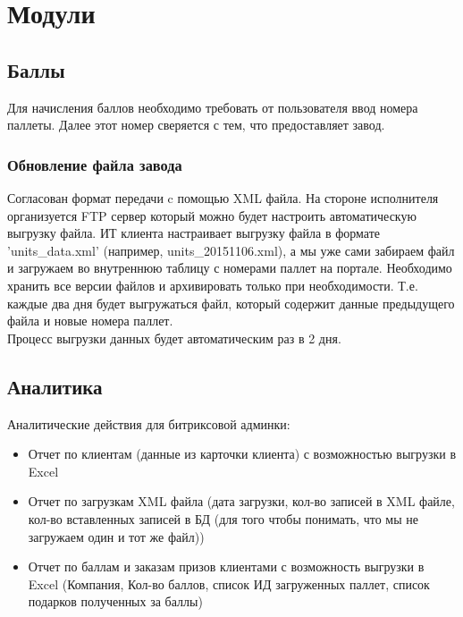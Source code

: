 \documentclass[DIV=calc, paper=a4, fontsize=11pt]{scrartcl} %
\begin{document}
\section{Модули} \label{sec:modules}

\subsection{Баллы}

Для начисления баллов необходимо требовать от пользователя ввод номера паллеты. Далее этот номер сверяется с тем, что предоставляет завод.

\subsubsection{Обновление файла завода}

Согласован формат передачи c помощью XML файла. На стороне исполнителя организуется FTP сервер который можно будет настроить автоматическую выгрузку файла. ИТ клиента настраивает выгрузку файла в формате 'units\_data.xml' (например, units\_20151106.xml), а мы уже сами забираем файл и загружаем во внутреннюю таблицу с номерами паллет на портале. Необходимо хранить все версии файлов и архивировать только при необходимости. Т.е. каждые два дня будет выгружаться файл, который содержит данные предыдущего файла и новые номера паллет.
\\[0.5cm]
Процесс выгрузки данных будет автоматическим раз в 2 дня.

\subsection{Аналитика}

Аналитические действия для битриксовой админки:

\begin{itemize}
	\item Отчет по клиентам (данные из карточки клиента) с возможностью выгрузки в Excel
	\item Отчет по загрузкам XML файла (дата загрузки, кол-во записей в XML файле, кол-во вставленных записей в БД (для того чтобы понимать, что мы не загружаем один и тот же файл))
	\item Отчет по баллам и заказам призов клиентами с возможность выгрузки в Excel (Компания, Кол-во баллов, список ИД  загруженных паллет, список подарков полученных за баллы)

\end{itemize}
\end{document}
